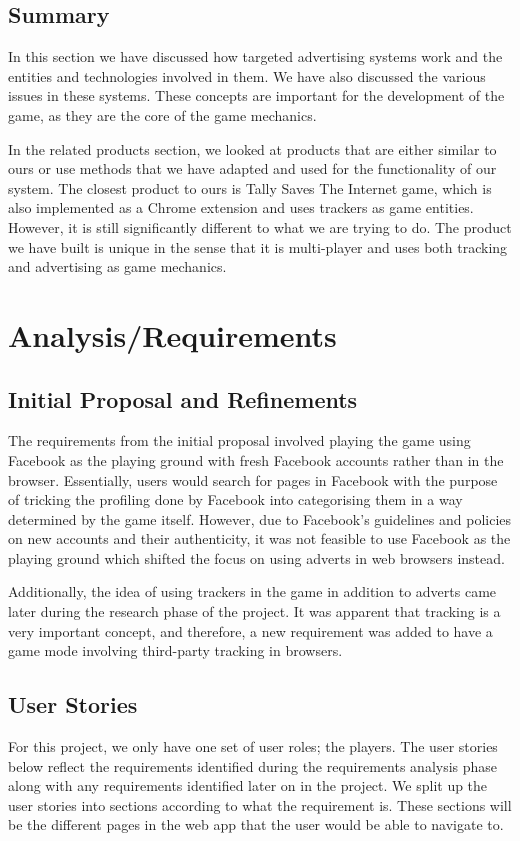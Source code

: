 \documentclass{l4proj}
\begin{document}
\section{Summary}
In this section we have discussed how targeted advertising systems work and the entities and technologies involved in them. We have also discussed the various issues in these systems. These concepts are important for the development of the game, as they are the core of the game mechanics. 

In the related products section, we looked at products that are either similar to ours or use methods that we have adapted and used for the functionality of our system. The closest product to ours is Tally Saves The Internet game, which is also implemented as a Chrome extension and uses trackers as game entities. However, it is still significantly different to what we are trying to do. The product we have built is unique in the sense that it is multi-player and uses both tracking and advertising as game mechanics. 

\chapter{Analysis/Requirements}

\section{Initial Proposal and Refinements}
The requirements from the initial proposal involved playing the game using Facebook as the playing ground with fresh Facebook accounts rather than in the browser. Essentially, users would search for pages in Facebook with the purpose of tricking the profiling done by Facebook into categorising them in a way determined by the game itself. However, due to Facebook's guidelines and policies on new accounts and their authenticity, it was not feasible to use Facebook as the playing ground which shifted the focus on using adverts in web browsers instead.

Additionally, the idea of using trackers in the game in addition to adverts came later during the research phase of the project. It was apparent that tracking is a very important concept, and therefore, a new requirement was added to have a game mode involving third-party tracking in browsers.

\section{User Stories}
For this project, we only have one set of user roles; the players. The user stories below reflect the requirements identified during the requirements analysis phase along with any requirements identified later on in the project. We split up the user stories into sections according to what the requirement is. These sections will be the different pages in the web app that the user would be able to navigate to.
\end{document}
